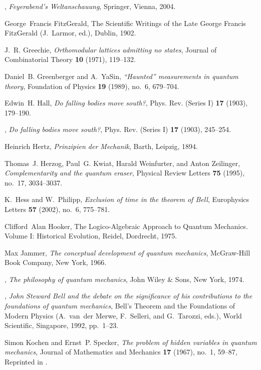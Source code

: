 \documentclass{article}
\begin{document}
\begin{thebibliography}{10}
\bysame, \emph{{F}eyerabend's {W}eltanschauung}, Springer, Vienna, 2004.

George~Francis FitzGerald, The Scientific Writings of the Late {G}eorge
  {F}rancis {F}itzGerald (J.~Larmor, ed.), Dublin, 1902.

J.~R. Greechie, \emph{Orthomodular lattices admitting no states}, Journal of
  Combinatorial Theory \textbf{10} (1971), 119--132.

Daniel~B. Greenberger and A.~YaSin, \emph{``{H}aunted'' measurements in quantum
  theory}, Foundation of Physics \textbf{19} (1989), no.~6, 679--704.

Edwin~H. Hall, \emph{Do falling bodies move south?}, Phys. Rev. (Series I)
  \textbf{17} (1903), 179--190.

\bysame, \emph{Do falling bodies move south?}, Phys. Rev. (Series I)
  \textbf{17} (1903), 245--254.

Heinrich Hertz, \emph{{P}rinzipien der {M}echanik}, Barth, Leipzig, 1894.

Thomas~J. Herzog, Paul~G. Kwiat, Harald Weinfurter, and Anton Zeilinger,
  \emph{Complementarity and the quantum eraser}, Physical Review Letters
  \textbf{75} (1995), no.~17, 3034--3037.

K.~Hess and W.~Philipp, \emph{Exclusion of time in the theorem of {B}ell},
  Europhysics Letters \textbf{57} (2002), no.~6, 775--781.

Clifford~Alan Hooker, The Logico-Algebraic Approach to Quantum Mechanics.
  Volume I: Historical Evolution, Reidel, Dordrecht, 1975.

Max Jammer, \emph{The conceptual development of quantum mechanics}, McGraw-Hill
  Book Company, New York, 1966.

\bysame, \emph{The philosophy of quantum mechanics}, John Wiley \& Sons, New
  York, 1974.

\bysame, \emph{John {S}teward {B}ell and the debate on the significance of his
  contributions to the foundations of quantum mechanics}, Bell's Theorem and
  the Foundations of Modern Physics (A.~van~der Merwe, F.~Selleri, and
  G.~Tarozzi, eds.), World Scientific, Singapore, 1992, pp.~1--23.

Simon Kochen and Ernst~P. Specker, \emph{The problem of hidden variables in
  quantum mechanics}, Journal of Mathematics and Mechanics \textbf{17} (1967),
  no.~1, 59--87, Reprinted in \cite[pp. 235--263]{specker-ges}.


\end{thebibliography}
\end{document}
